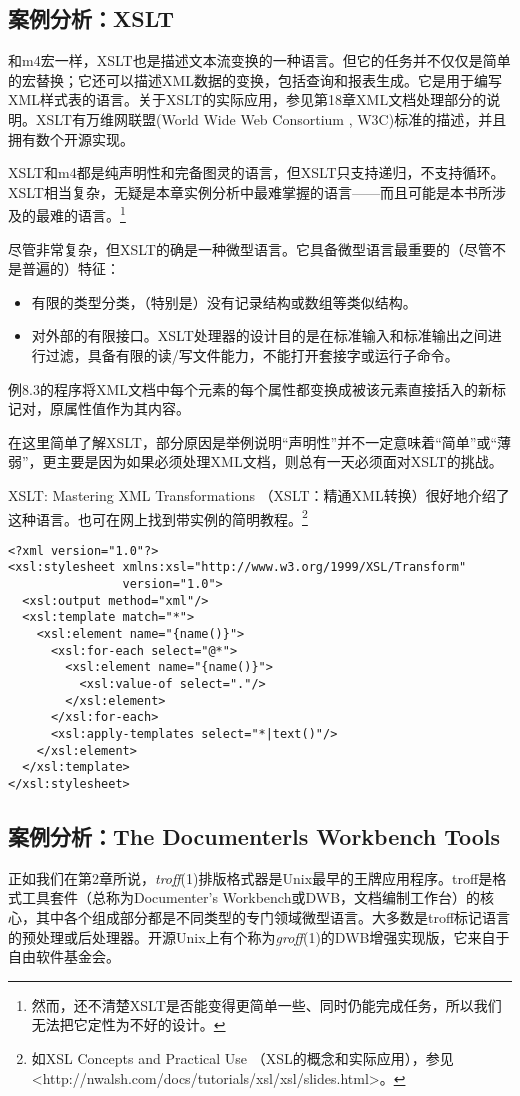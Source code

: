 \documentclass[12pt,oneside]{book}
\begin{document}
\begin{common-format}
\subsection{案例分析：XSLT}
和m4宏一样，XSLT也是描述文本流变换的一种语言。但它的任务并不仅仅是简单的宏替换；它还可以描述XML数据的变换，包括查询和报表生成。它是用于编写XML样式表的语言。关于XSLT的实际应用，参见第18章XML文档处理部分的说明。XSLT有万维网联盟(World Wide Web Consortium , W3C)标准的描述，并且拥有数个开源实现。

XSLT和m4都是纯声明性和完备图灵的语言，但XSLT只支持递归，不支持循环。XSLT相当复杂，无疑是本章实例分析中最难掌握的语言——而且可能是本书所涉及的最难的语言。\footnote{然而，还不清楚XSLT是否能变得更简单一些、同时仍能完成任务，所以我们无法把它定性为不好的设计。}

尽管非常复杂，但XSLT的确是一种微型语言。它具备微型语言最重要的（尽管不是普遍的）特征：
\begin{itemize}
\item 有限的类型分类，（特别是）没有记录结构或数组等类似结构。
\item 对外部的有限接口。XSLT处理器的设计目的是在标准输入和标准输出之间进行过滤，具备有限的读/写文件能力，不能打开套接字或运行子命令。
\end{itemize}

例8.3的程序将XML文档中每个元素的每个属性都变换成被该元素直接括入的新标记对，原属性值作为其内容。

在这里简单了解XSLT，部分原因是举例说明“声明性”并不一定意味着“简单”或“薄弱”，更主要是因为如果必须处理XML文档，则总有一天必须面对XSLT的挑战。

XSLT: Mastering XML Transformations （XSLT：精通XML转换）\cite{Tidwell}很好地介绍了这种语言。也可在网上找到带实例的简明教程。\footnote{如XSL Concepts and Practical Use （XSL的概念和实际应用），参见<http://nwalsh.com/docs/tutorials/xsl/xsl/slides.html>。}


\begin{Verbatim}[label=例 8.3 XSLT程序实例]
<?xml version="1.0"?>
<xsl:stylesheet xmlns:xsl="http://www.w3.org/1999/XSL/Transform" 
                version="1.0">
  <xsl:output method="xml"/>
  <xsl:template match="*">
    <xsl:element name="{name()}">
      <xsl:for-each select="@*">
        <xsl:element name="{name()}">
          <xsl:value-of select="."/>
        </xsl:element>
      </xsl:for-each>
      <xsl:apply-templates select="*|text()"/>
    </xsl:element>
  </xsl:template> 
</xsl:stylesheet>
\end{Verbatim}


\subsection{案例分析：The Documenterls Workbench Tools}
正如我们在第2章所说，\textit{troff}(1)排版格式器是Unix最早的王牌应用程序。troff是格式工具套件（总称为Documenter's Workbench或DWB，文档编制工作台）的核心，其中各个组成部分都是不同类型的专门领域微型语言。大多数是troff标记语言的预处理或后处理器。开源Unix上有个称为\textit{groff}(1)的DWB增强实现版，它来自于自由软件基金会。


\end{common-format}
\end{document}
